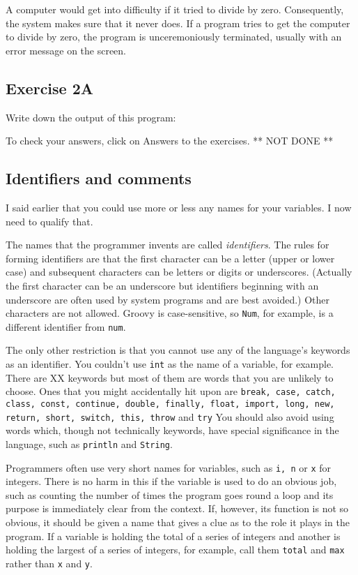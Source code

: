 A computer would get into difficulty if it tried to divide by zero.
Consequently, the system makes sure that it never does.
If a program tries to get the computer to divide by zero, the program
is unceremoniously terminated, usually with an error message on the
screen.

\subsection*{Exercise 2A}

Write down the output of this program:


To check your answers, click on  Answers to the exercises. ** NOT DONE **

\subsection{Identifiers and comments}

I said earlier that you could use more or less any names for your variables.
I now need to qualify that.

The names that the programmer invents are called \emph{identifiers}.  The
rules for forming identifiers are that the first character can be a letter
(upper or lower case) and subsequent characters can be letters or digits
or underscores.  (Actually the first character can be an underscore but
identifiers beginning with an underscore are often used by system programs
and are best avoided.)  Other characters are not allowed.  Groovy is
case-sensitive, so \verb!Num!, for example, is a different identifier from
 \verb!num!.

The only other restriction is that you cannot use any of the language's keywords
as an identifier.  You couldn't use \verb!int! as the name of a variable,
for example.  There are XX keywords but most of them are words that you
are unlikely to choose.
Ones that you might accidentally hit upon are \texttt{break, case, catch, class,
const, continue, double, finally, float, import, long, new, return,
short, switch, this, throw} and \texttt{try}   You should also avoid
using words which, though not technically keywords, have special significance
in the language, such as \verb!println! and \verb!String!.

Programmers often use very short names for variables, such as \verb!i, n! or
\verb!x! for integers.  There is no harm in this if the variable is used to
do an obvious job, such as counting the number of times the program goes round
a loop and its purpose is immediately clear from the context.  If, however, its
function is not so obvious, it should be given a name that
gives a clue as to the role it plays in the program.  If a variable is
holding the total of a series of integers and another is holding the
largest of a series of integers, for example, call them \verb!total!
and \verb!max! rather than \verb!x! and \verb!y!.

